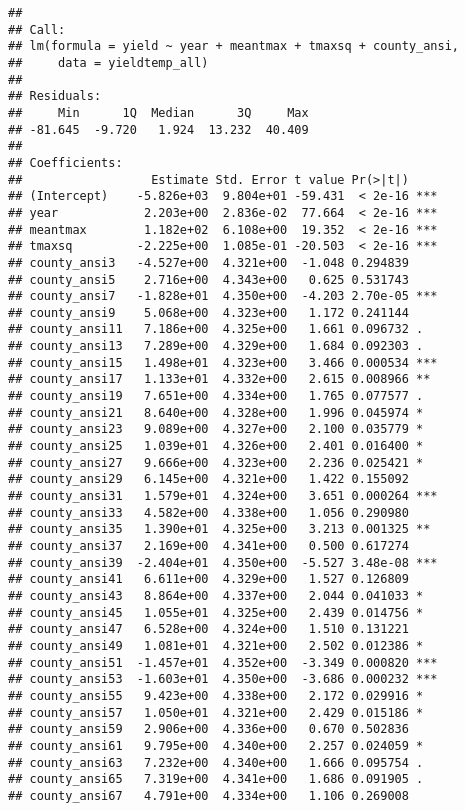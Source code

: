 \documentclass[
]{book}
\begin{document}
\begin{verbatim}
## 
## Call:
## lm(formula = yield ~ year + meantmax + tmaxsq + county_ansi, 
##     data = yieldtemp_all)
## 
## Residuals:
##     Min      1Q  Median      3Q     Max 
## -81.645  -9.720   1.924  13.232  40.409 
## 
## Coefficients:
##                  Estimate Std. Error t value Pr(>|t|)    
## (Intercept)    -5.826e+03  9.804e+01 -59.431  < 2e-16 ***
## year            2.203e+00  2.836e-02  77.664  < 2e-16 ***
## meantmax        1.182e+02  6.108e+00  19.352  < 2e-16 ***
## tmaxsq         -2.225e+00  1.085e-01 -20.503  < 2e-16 ***
## county_ansi3   -4.527e+00  4.321e+00  -1.048 0.294839    
## county_ansi5    2.716e+00  4.343e+00   0.625 0.531743    
## county_ansi7   -1.828e+01  4.350e+00  -4.203 2.70e-05 ***
## county_ansi9    5.068e+00  4.323e+00   1.172 0.241144    
## county_ansi11   7.186e+00  4.325e+00   1.661 0.096732 .  
## county_ansi13   7.289e+00  4.329e+00   1.684 0.092303 .  
## county_ansi15   1.498e+01  4.323e+00   3.466 0.000534 ***
## county_ansi17   1.133e+01  4.332e+00   2.615 0.008966 ** 
## county_ansi19   7.651e+00  4.334e+00   1.765 0.077577 .  
## county_ansi21   8.640e+00  4.328e+00   1.996 0.045974 *  
## county_ansi23   9.089e+00  4.327e+00   2.100 0.035779 *  
## county_ansi25   1.039e+01  4.326e+00   2.401 0.016400 *  
## county_ansi27   9.666e+00  4.323e+00   2.236 0.025421 *  
## county_ansi29   6.145e+00  4.321e+00   1.422 0.155092    
## county_ansi31   1.579e+01  4.324e+00   3.651 0.000264 ***
## county_ansi33   4.582e+00  4.338e+00   1.056 0.290980    
## county_ansi35   1.390e+01  4.325e+00   3.213 0.001325 ** 
## county_ansi37   2.169e+00  4.341e+00   0.500 0.617274    
## county_ansi39  -2.404e+01  4.350e+00  -5.527 3.48e-08 ***
## county_ansi41   6.611e+00  4.329e+00   1.527 0.126809    
## county_ansi43   8.864e+00  4.337e+00   2.044 0.041033 *  
## county_ansi45   1.055e+01  4.325e+00   2.439 0.014756 *  
## county_ansi47   6.528e+00  4.324e+00   1.510 0.131221    
## county_ansi49   1.081e+01  4.321e+00   2.502 0.012386 *  
## county_ansi51  -1.457e+01  4.352e+00  -3.349 0.000820 ***
## county_ansi53  -1.603e+01  4.350e+00  -3.686 0.000232 ***
## county_ansi55   9.423e+00  4.338e+00   2.172 0.029916 *  
## county_ansi57   1.050e+01  4.321e+00   2.429 0.015186 *  
## county_ansi59   2.906e+00  4.336e+00   0.670 0.502836    
## county_ansi61   9.795e+00  4.340e+00   2.257 0.024059 *  
## county_ansi63   7.232e+00  4.340e+00   1.666 0.095754 .  
## county_ansi65   7.319e+00  4.341e+00   1.686 0.091905 .  
## county_ansi67   4.791e+00  4.334e+00   1.106 0.269008    

\end{verbatim}
\end{document}
